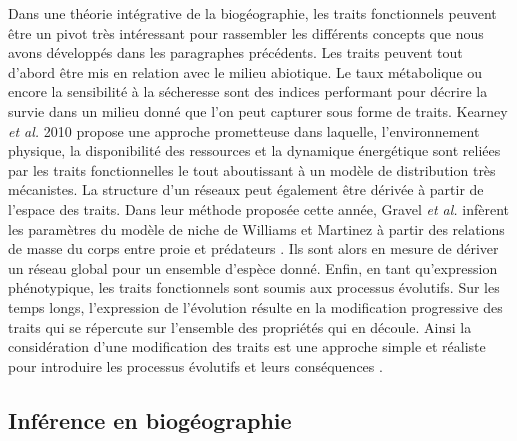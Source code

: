 Dans une théorie intégrative de la biogéographie, les traits
fonctionnels peuvent être un pivot très intéressant pour rassembler les
différents concepts que nous avons développés dans les paragraphes
précédents. Les traits peuvent tout d'abord être mis en relation avec le
milieu abiotique. Le taux métabolique ou encore la sensibilité à la
sécheresse sont des indices performant pour décrire la survie dans un
milieu donné \cite{Kearney2004,Engelbrecht2007} que l'on peut capturer
sous forme de traits. Kearney \textit{et al.} 2010 propose une approche
prometteuse dans laquelle, l'environnement physique, la disponibilité
des ressources et la dynamique énergétique sont reliées par les traits
fonctionnelles le tout aboutissant à un modèle de distribution très
mécanistes. La structure d'un réseaux peut également être dérivée à
partir de l'espace des traits. Dans leur méthode proposée cette année,
Gravel \textit{et al.} infèrent les paramètres du modèle de niche de
Williams et Martinez \cite{Williams2000} à partir des relations de masse
du corps entre proie et prédateurs \cite{Gravel2013}. Ils sont alors en
mesure de dériver un réseau global pour un ensemble d'espèce donné.
Enfin, en tant qu'expression phénotypique, les traits fonctionnels sont
soumis aux processus évolutifs. Sur les temps longs, l'expression de
l'évolution résulte en la modification progressive des traits qui se
répercute sur l'ensemble des propriétés qui en découle. Ainsi la
considération d'une modification des traits est une approche simple et
réaliste pour introduire les processus évolutifs et leurs conséquences
\cite{Guill2008,Loeuille2005}.

\subsection{Inférence en biogéographie}


